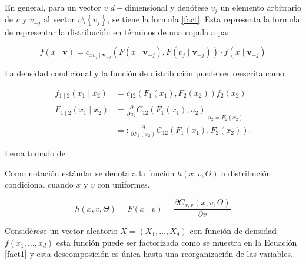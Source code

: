 En general, para un vector $v$ $d-$dimensional y denótese $v_j$ un elemento arbitrario de $v$ y $v_{-j}$ al vector $v \setminus \left\{ v_j \right\}$, se tiene la formula \eqref{fact}. Esta representa la formula de representar la distribución en términos de una copula a par.

\begin{equation}\label{fact}
    f(x \mid \boldsymbol{v}) = c_{x v_j \mid \boldsymbol{v}_{-j}} (  F \left(x \mid \boldsymbol{v}_{-j}\right), F\left(v_j \mid \boldsymbol{v}_{-j}\right) ) \cdot f\left(x \mid \boldsymbol{v}_{-j}\right)
\end{equation}

\begin{lema}La densidad condicional y la función de distribución puede ser reescrita como

\begin{equation}
    \begin{aligned}
    f_{1 \mid 2}\left(x_1 \mid x_2\right) & =c_{12}\left(F_1\left(x_1\right), F_2\left(x_2\right)\right) f_2\left(x_2\right) \\
    F_{1 \mid 2}\left(x_1 \mid x_2\right) & =\left.\frac{\partial}{\partial u_2} C_{12}\left(F_1\left(x_1\right), u_2\right)\right|_{u_2=F_2\left(x_2\right)} \\
    & =: \frac{\partial}{\partial F_2\left(x_2\right)} C_{12}\left(F_1\left(x_1\right), F_2\left(x_2\right)\right) .
    \end{aligned}
\end{equation}

Lema tomado de \cite[pag 20]{czadoAnalyzing}.
\end{lema}

Como notación estándar se denota a la función $h(x, v, \Theta)$ a distribución condicional cuando $x$ y $v$ con uniformes. 

\begin{equation}
    h(x, v, \Theta) = F(x \mid v)=\frac{\partial C_{x, v}(x, v, \Theta)}{\partial v}
\end{equation}

Considérese un vector aleatorio $X = (X_1, \dots, X_d)$ con función de densidad $f(x_1, \dots, x_d)$ esta función puede ser factorizada como se muestra en la Ecuación \eqref{fact1} y esta descomposición es única hasta una reorganización de las variables.

